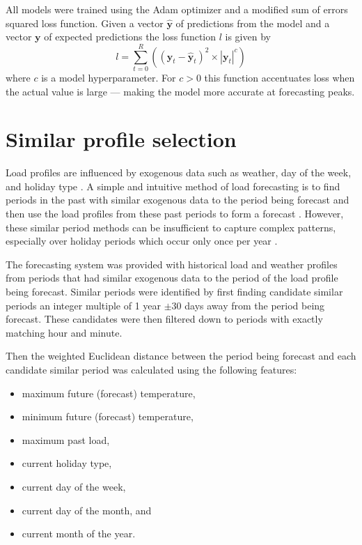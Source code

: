 All models were trained using the Adam optimizer \cite{Kingma2014} and a modified sum of errors squared loss function.
Given a vector $\boldsymbol{\hat{y}}$ of predictions from the model and a vector $\boldsymbol{y}$ of expected predictions the loss function $l$ is given by 
\begin{equation}
l = \sum_{t=0}^{R}((\boldsymbol{y}_t - \boldsymbol{\hat{y}}_t)^2 \times |\boldsymbol{y}_t|^c)
\end{equation}
where $c$ is a model hyperparameter.
For $c>0$ this function accentuates loss when the actual value is large --- making the model more accurate at forecasting peaks.


\section{Similar profile selection} \label{simperiod}
Load profiles are influenced by exogenous data such as weather, day of the week, and holiday type \cite{Weron2006}.
A simple and intuitive method of load forecasting is to find periods in the past with similar exogenous data to the period being forecast and then use the load profiles from these past periods to form a forecast \cite{Senjyu1998}.
However, these similar period methods can be insufficient to capture complex patterns, especially over holiday periods which occur only once per year \cite{Chen2010}.


The forecasting system was provided with historical load and weather profiles from periods that had similar exogenous data to the period of the load profile being forecast.
Similar periods were identified by first finding candidate similar periods an integer multiple of 1 year $\pm$30 days away from the period being forecast.
These candidates were then filtered down to periods with exactly matching hour and minute.

Then the weighted Euclidean distance between the period being forecast and each candidate similar period was calculated using the following features: 
\begin{itemize}
	\item maximum future (forecast) temperature, 
	\item minimum future (forecast) temperature,
	\item maximum past load,
	\item current holiday type, 
	\item current day of the week,
	\item current day of the month, and
	\item current month of the year.
\end{itemize}

